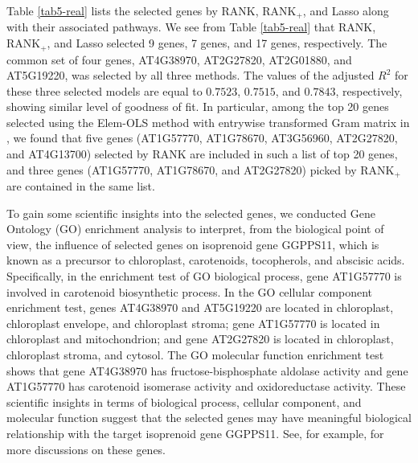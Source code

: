 \documentclass[11pt]{article}
\begin{document}
Table \ref{tab5-real} lists the selected genes by RANK, RANK$_+$, and Lasso along with their associated pathways. %
We see from Table \ref{tab5-real} that RANK, RANK$_+$, and Lasso selected 9 genes, 7 genes, and 17 genes, respectively. The common set of four genes, AT4G38970, AT2G27820, AT2G01880, and AT5G19220, was selected by all three  methods. The values of the adjusted $R^2$ for these three selected models are equal to $0.7523$, $0.7515$, and $0.7843$, respectively, showing similar level of goodness of fit.
In particular, among the top 20 genes selected using the Elem-OLS method with entrywise transformed Gram matrix in \cite{Yang2014}, we found that five genes (AT1G57770, AT1G78670, AT3G56960, AT2G27820, and AT4G13700) selected by RANK are included in such a list of top 20 genes, and three genes (AT1G57770, AT1G78670,  and  AT2G27820) picked by RANK$_+$ are contained in the same list.

To gain some scientific insights into the selected genes, we conducted Gene Ontology (GO) enrichment analysis to interpret, from the biological point of view, the influence of selected genes on isoprenoid gene GGPPS11, %
which is known as a precursor to chloroplast, carotenoids, tocopherols, and abscisic acids. Specifically, in the enrichment test of GO biological process, gene AT1G57770 is involved in carotenoid biosynthetic process. In the GO cellular component enrichment test, %
genes AT4G38970 and AT5G19220 are located in chloroplast, chloroplast envelope, and chloroplast stroma; gene AT1G57770 is located in chloroplast and mitochondrion; and gene AT2G27820 is located in chloroplast, chloroplast stroma, and cytosol. The GO molecular function enrichment test shows that gene AT4G38970 has fructose-bisphosphate aldolase activity and gene AT1G57770 has carotenoid isomerase activity and oxidoreductase activity. These scientific insights in terms of biological process, cellular component, and molecular function suggest that the selected genes may have meaningful biological relationship with the target isoprenoid gene GGPPS11. See, for example, \cite{Horvath2003, Ramel2009, Wienkoop2004} for more discussions on these genes.
\end{document}
